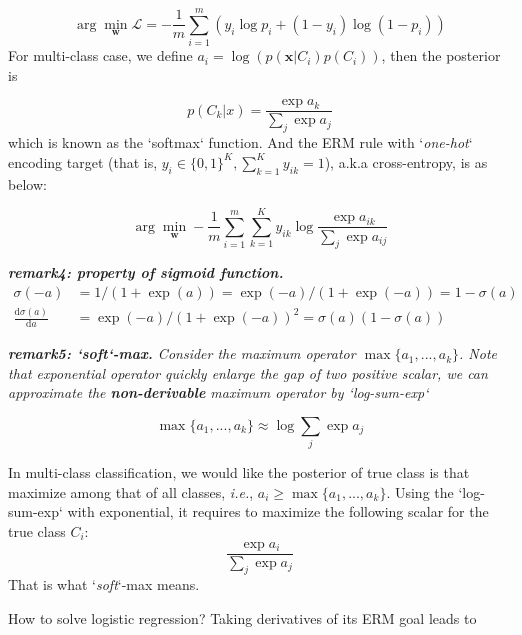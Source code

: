 \documentclass{article}
\begin{document}
	\begin{equation}
	\arg \min_\mathbf{w}  \mathcal{L} = - \frac{1}{m} \sum_{i=1}^m \left( y_i \log p_i  + (1-y_i) \log (1-p_i)\right)
	\end{equation}
	For multi-class case, we define $a_i=\log (p(\mathbf{x}|C_i)p(C_i))$, then the posterior is
	
	$$p(C_k|x)=\frac{\exp a_k}{ \sum_j \exp a_j}$$
which is known as the `softmax` function. And the ERM rule with `\textit{one-hot}` encoding target (that is, $y_i \in \{0,1\}^K, \sum_{k=1}^K y_{ik}=1$), a.k.a cross-entropy, is as below:

	$$\arg \min_\mathbf{w}  - \frac{1}{m} \sum_{i=1}^m \sum_{k=1}^K  y_{ik} \log \frac{\exp a_{ik}}{ \sum_j \exp a_{ij}}$$
	
\begin{framed}
	\begin{scriptsize}
	\begin{spacing}{1.2}
	\noindent\textit{\textbf{remark4: property of sigmoid function.}}
	\begin{equation*}
	\begin{split}
	\sigma(-a) &= 1/(1+\exp(a)) = \exp(-a) / (1 + \exp(-a)) = 1-\sigma(a) \\
	\frac{\text{d} \sigma(a)}{\text{d} a}&= \exp(-a)/(1+\exp(-a))^2 = \sigma(a) (1-\sigma(a))
	\end{split}
	\end{equation*}
	
	\noindent\textit{\textbf{remark5: `soft`-max.} Consider the maximum operator $\max \{a_1, ..., a_k\}$. Note that exponential operator quickly enlarge the gap of two positive scalar, we can approximate the \textbf{non-derivable} maximum operator by `\textit{log-sum-exp}` }
	
	$$\max \{a_1, ..., a_k\} \approx \log\sum_j \exp a_j$$
	
	In multi-class classification, we would like the posterior of true class is that maximize among that of all classes, \textit{i.e.}, $a_i\geq \max\{a_1, ..., a_k\} $. Using the `log-sum-exp` with exponential, it requires to maximize the following scalar for the true class $C_i$:
	$$\frac{\exp a_i}{\sum_j \exp a_j} $$
That is what `\textit{soft}`-max means.
	\end{spacing}
	\end{scriptsize}
	\end{framed}
	
	How to solve logistic regression? Taking derivatives of its ERM goal leads to
	
\end{document}
